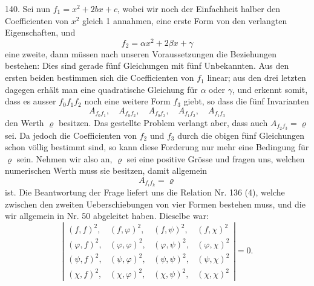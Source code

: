 140. Sei nun $f_1 = x^2 + 2bx + c$, wobei wir noch der Einfachheit
 halber den Coefficienten von $x^2$ gleich 1 annahmen, eine erste
Form von den verlangten Eigenschaften, und
\[
f_2 = \alpha x^2 + 2\beta x + \gamma
\]
eine zweite, dann müssen nach unseren Voraussetzungen die Beziehungen
 bestehen:
Dies sind gerade fünf Gleichungen mit fünf Unbekannten. Aus den
ersten beiden bestimmen sich die Coefficienten von $f_1$ linear; aus den
drei letzten dagegen erhält man eine quadratische Gleichung für $\alpha$
oder $\gamma$, und erkennt somit, dass es ausser $f_0 f_1 f_2$ noch eine weitere
Form $f_3$ giebt, so dass die fünf Invarianten
\[
A_{f_0f_1}, \quad A_{f_0f_2}, \quad A_{f_0f_3}, \quad A_{f_1f_2}, \quad A_{f_1f_3}
\]
den Werth $\varrho$ besitzen. Das gestellte Problem verlangt aber, dass
auch $A_{f_2f_3} = \varrho$ sei. Da jedoch die Coefficienten von $f_2$ und $f_3$ durch
die obigen fünf Gleichungen schon völlig bestimmt sind, so kann
diese Forderung nur mehr eine Bedingung für $\varrho$ sein. Nehmen wir
also an, $\varrho$ sei eine positive Grösse und fragen uns, welchen numerischen
 Werth muss sie besitzen, damit allgemein
\[
A_{f_if_k} = \varrho
\]
ist. Die Beantwortung der Frage liefert uns die Relation Nr. 136 (4),
welche zwischen den zweiten Ueberschiebungen von vier Formen bestehen
 muss, und die wir allgemein in Nr. 50 abgeleitet haben. Dieselbe
 war:
\[
\left|\begin{array}{cccc}
(f,f)^2, & (f,\varphi)^2, & (f,\psi)^2, & (f,\chi)^2 \\
(\varphi,f)^2, & (\varphi,\varphi)^2, & (\varphi,\psi)^2, & (\varphi,\chi)^2 \\
(\psi,f)^2, & (\psi,\varphi)^2, & (\psi,\psi)^2, & (\psi,\chi)^2 \\
(\chi,f)^2, & (\chi,\varphi)^2, & (\chi,\psi)^2, & (\chi,\chi)^2
\end{array}\right| = 0.
\]


